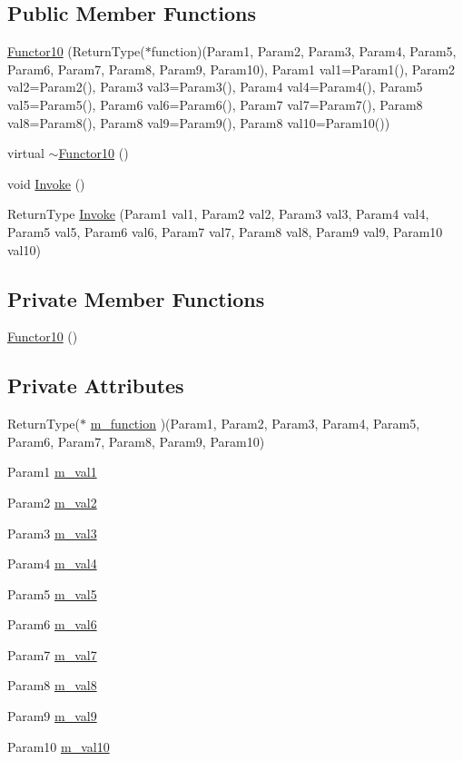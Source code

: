 \subsection*{Public Member Functions}
\begin{CompactItemize}
\item 
\hyperlink{classDL_1_1Functor10_a0}{Functor10} (Return\-Type($\ast$function)(Param1, Param2, Param3, Param4, Param5, Param6, Param7, Param8, Param9, Param10), Param1 val1=Param1(), Param2 val2=Param2(), Param3 val3=Param3(), Param4 val4=Param4(), Param5 val5=Param5(), Param6 val6=Param6(), Param7 val7=Param7(), Param8 val8=Param8(), Param8 val9=Param9(), Param8 val10=Param10())
\item 
virtual \hyperlink{classDL_1_1Functor10_a1}{$\sim$Functor10} ()
\item 
void \hyperlink{classDL_1_1Functor10_a2}{Invoke} ()
\item 
Return\-Type \hyperlink{classDL_1_1Functor10_a3}{Invoke} (Param1 val1, Param2 val2, Param3 val3, Param4 val4, Param5 val5, Param6 val6, Param7 val7, Param8 val8, Param9 val9, Param10 val10)
\end{CompactItemize}
\subsection*{Private Member Functions}
\begin{CompactItemize}
\item 
\hyperlink{classDL_1_1Functor10_d0}{Functor10} ()
\end{CompactItemize}
\subsection*{Private Attributes}
\begin{CompactItemize}
\item 
Return\-Type($\ast$ \hyperlink{classDL_1_1Functor10_r0}{m\_\-function} )(Param1, Param2, Param3, Param4, Param5, Param6, Param7, Param8, Param9, Param10)
\item 
Param1 \hyperlink{classDL_1_1Functor10_r1}{m\_\-val1}
\item 
Param2 \hyperlink{classDL_1_1Functor10_r2}{m\_\-val2}
\item 
Param3 \hyperlink{classDL_1_1Functor10_r3}{m\_\-val3}
\item 
Param4 \hyperlink{classDL_1_1Functor10_r4}{m\_\-val4}
\item 
Param5 \hyperlink{classDL_1_1Functor10_r5}{m\_\-val5}
\item 
Param6 \hyperlink{classDL_1_1Functor10_r6}{m\_\-val6}
\item 
Param7 \hyperlink{classDL_1_1Functor10_r7}{m\_\-val7}
\item 
Param8 \hyperlink{classDL_1_1Functor10_r8}{m\_\-val8}
\item 
Param9 \hyperlink{classDL_1_1Functor10_r9}{m\_\-val9}
\item 
Param10 \hyperlink{classDL_1_1Functor10_r10}{m\_\-val10}
\end{CompactItemize}


